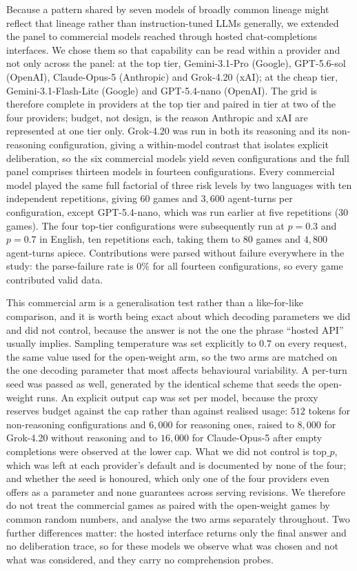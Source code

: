 \documentclass[openacc]{rsproca_new}
\begin{document}
Because a pattern shared by seven models of broadly common lineage might reflect that lineage rather than instruction-tuned LLMs generally, we extended the panel to commercial models reached through hosted chat-completions interfaces. We chose them so that capability can be read within a provider and not only across the panel: at the top tier, Gemini-3.1-Pro (Google), GPT-5.6-sol (OpenAI), Claude-Opus-5 (Anthropic) and Grok-4.20 (xAI); at the cheap tier, Gemini-3.1-Flash-Lite (Google) and GPT-5.4-nano (OpenAI). The grid is therefore complete in providers at the top tier and paired in tier at two of the four providers; budget, not design, is the reason Anthropic and xAI are represented at one tier only. Grok-4.20 was run in both its reasoning and its non-reasoning configuration, giving a within-model contrast that isolates explicit deliberation, so the six commercial models yield seven configurations and the full panel comprises thirteen models in fourteen configurations. Every commercial model played the same full factorial of three risk levels by two languages with ten independent repetitions, giving $60$ games and $3{,}600$ agent-turns per configuration, except GPT-5.4-nano, which was run earlier at five repetitions ($30$ games). The four top-tier configurations were subsequently run at $p=0.3$ and $p=0.7$ in English, ten repetitions each, taking them to $80$ games and $4{,}800$ agent-turns apiece. Contributions were parsed without failure everywhere in the study: the parse-failure rate is $0\%$ for all fourteen configurations, so every game contributed valid data.

This commercial arm is a generalisation test rather than a like-for-like comparison, and it is worth being exact about which decoding parameters we did and did not control, because the answer is not the one the phrase ``hosted API'' usually implies. Sampling temperature was set explicitly to $0.7$ on every request, the same value used for the open-weight arm, so the two arms are matched on the one decoding parameter that most affects behavioural variability. A per-turn seed was passed as well, generated by the identical scheme that seeds the open-weight runs. An explicit output cap was set per model, because the proxy reserves budget against the cap rather than against realised usage: $512$ tokens for non-reasoning configurations and $6{,}000$ for reasoning ones, raised to $8{,}000$ for Grok-4.20 without reasoning and to $16{,}000$ for Claude-Opus-5 after empty completions were observed at the lower cap. What we did not control is $\mathrm{top}\_p$, which was left at each provider's default and is documented by none of the four; and whether the seed is honoured, which only one of the four providers even offers as a parameter and none guarantees across serving revisions. We therefore do not treat the commercial games as paired with the open-weight games by common random numbers, and analyse the two arms separately throughout. Two further differences matter: the hosted interface returns only the final answer and no deliberation trace, so for these models we observe what was chosen and not what was considered, and they carry no comprehension probes.
\end{document}
